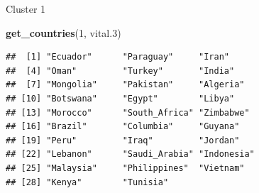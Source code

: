 \documentclass[ignorenonframetext,]{beamer}
\newenvironment{Shaded}{\begin{snugshade}}{\end{snugshade}}
\newcommand{\DecValTok}[1]{\textcolor[rgb]{0.00,0.00,0.81}{#1}}
\newcommand{\FloatTok}[1]{\textcolor[rgb]{0.00,0.00,0.81}{#1}}
\newcommand{\KeywordTok}[1]{\textcolor[rgb]{0.13,0.29,0.53}{\textbf{#1}}}
\newcommand{\NormalTok}[1]{#1}
\begin{document}
\begin{frame}[fragile]{Cluster 1}
\protect\hypertarget{cluster-1}{}

\begin{Shaded}
\begin{Highlighting}[]
\KeywordTok{get_countries}\NormalTok{(}\DecValTok{1}\NormalTok{, vital}\FloatTok{.3}\NormalTok{)}
\end{Highlighting}
\end{Shaded}

\begin{verbatim}
##  [1] "Ecuador"      "Paraguay"     "Iran"        
##  [4] "Oman"         "Turkey"       "India"       
##  [7] "Mongolia"     "Pakistan"     "Algeria"     
## [10] "Botswana"     "Egypt"        "Libya"       
## [13] "Morocco"      "South_Africa" "Zimbabwe"    
## [16] "Brazil"       "Columbia"     "Guyana"      
## [19] "Peru"         "Iraq"         "Jordan"      
## [22] "Lebanon"      "Saudi_Arabia" "Indonesia"   
## [25] "Malaysia"     "Philippines"  "Vietnam"     
## [28] "Kenya"        "Tunisia"
\end{verbatim}

\end{frame}
\end{document}
